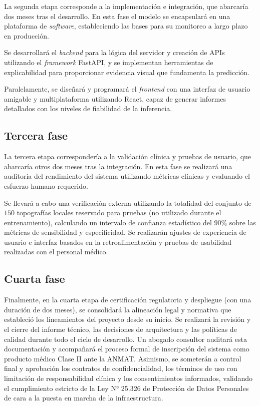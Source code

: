         La segunda etapa corresponde a la implementación e integración, que abarcaría dos meses tras el desarrollo. En esta fase el modelo se encapsulará en una plataforma de \textit{software}, estableciendo las bases para su monitoreo a largo plazo en producción. 
    
        Se desarrollará el \textit{backend} para la lógica del servidor y creación de APIs utilizando el \textit{framework} FastAPI, y se implementan herramientas de explicabilidad para proporcionar evidencia visual que fundamenta la predicción. 
        
        Paralelamente, se diseñará y programará el \textit{frontend} con una interfaz de usuario amigable y multiplataforma utilizando React, capaz de generar informes detallados con los niveles de fiabilidad de la inferencia.

     \subsection*{Tercera fase}
            
        La tercera etapa correspondería a la validación clínica y pruebas de usuario, que abarcaría otros dos meses tras la integración. En esta fase se realizará una auditoría del rendimiento del sistema utilizando métricas clínicas y evaluando el esfuerzo humano requerido. 
    
        Se llevará a cabo una verificación externa utilizando la totalidad del conjunto de $150$ topografías locales reservado para pruebas (no utilizado durante el entrenamiento), calculando un intervalo de confianza estadístico del $90\%$ sobre las métricas de sensibilidad y especificidad. Se realizarán ajustes de experiencia de usuario e interfaz basados en la retroalimentación y pruebas de usabilidad realizadas con el personal médico.

     \subsection*{Cuarta fase}
        
        Finalmente, en la cuarta etapa de certificación regulatoria y despliegue (con una duración de dos meses), se consolidará la alineación legal y normativa que estableció los lineamientos del proyecto desde su inicio. Se realizará la revisión y el cierre del informe técnico, las decisiones de arquitectura y las políticas de calidad durante todo el ciclo de desarrollo. Un abogado consultor auditará esta documentación y acompañará el proceso formal de inscripción del sistema como producto médico Clase II ante la ANMAT. Asimismo, se someterán a control final y aprobación los contratos de confidencialidad, los términos de uso con limitación de responsabilidad clínica y los consentimientos informados, validando el cumplimiento estricto de la Ley N° 25.326 de Protección de Datos Personales de cara a la puesta en marcha de la infraestructura.
    
